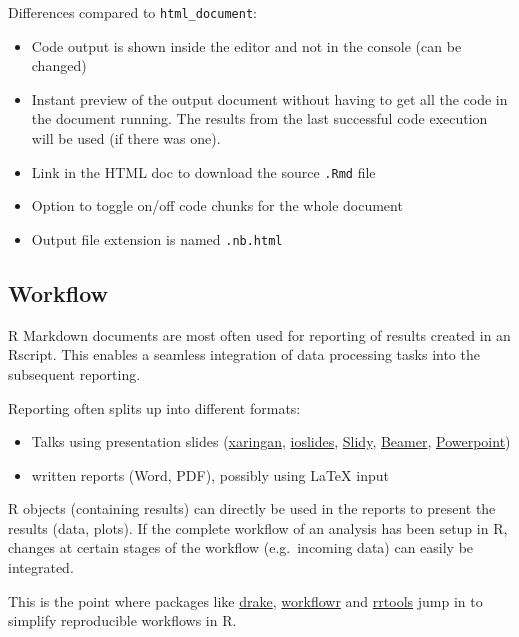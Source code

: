 \documentclass[]{book}
\providecommand{\tightlist}{%
  \setlength{\itemsep}{0pt}\setlength{\parskip}{0pt}}
\begin{document}
Differences compared to \texttt{html\_document}:

\begin{itemize}
\item
  Code output is shown inside the editor and not in the console (can be changed)
\item
  Instant preview of the output document without having to get all the code in the document running. The results from the last successful code execution will be used (if there was one).
\item
  Link in the HTML doc to download the source \texttt{.Rmd} file
\item
  Option to toggle on/off code chunks for the whole document
\item
  Output file extension is named \texttt{.nb.html}
\end{itemize}

\hypertarget{workflow}{%
\subsection{Workflow}\label{workflow}}

R Markdown documents are most often used for reporting of results created in an Rscript.
This enables a seamless integration of data processing tasks into the subsequent reporting.

Reporting often splits up into different formats:

\begin{itemize}
\tightlist
\item
  Talks using presentation slides (\href{https://bookdown.org/yihui/rmarkdown/xaringan.html}{xaringan}, \href{https://bookdown.org/yihui/rmarkdown/ioslides-presentation.html}{ioslides}, \href{https://bookdown.org/yihui/rmarkdown/slidy-presentation.html}{Slidy}, \href{https://bookdown.org/yihui/rmarkdown/beamer-presentation.html}{Beamer}, \href{https://bookdown.org/yihui/rmarkdown/powerpoint-presentation.html}{Powerpoint})
\item
  written reports (Word, PDF), possibly using LaTeX input
\end{itemize}

R objects (containing results) can directly be used in the reports to present the results (data, plots).
If the complete workflow of an analysis has been setup in R, changes at certain stages of the workflow (e.g.~incoming data) can easily be integrated.

This is the point where packages like \href{https://docs.ropensci.org/drake/}{drake}, \href{https://jdblischak.github.io/workflowr/}{workflowr} and \href{https://github.com/benmarwick/rrtools}{rrtools} jump in to simplify reproducible workflows in R.
\end{document}
